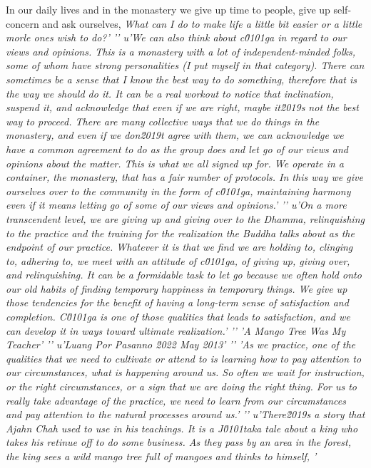 In our daily lives and in the monastery we give up time to people, give 
up self-concern and ask ourselves, \emph{What can I do to make life a 
little bit easier or a little morle ones wish to do?'
'\n'
u'We can also think about c\u0101ga in regard to our views and opinions. This is a monastery with a lot of independent-minded folks, some of whom have strong personalities (I put myself in that category). There can sometimes be a sense that I know the best way to do something, therefore that is the way we should do it. It can be a real workout to notice that inclination, suspend it, and acknowledge that even if we are right, maybe it\u2019s not the best way to proceed. There are many collective ways that we do things in the monastery, and even if we don\u2019t agree with them, we can acknowledge we have a common agreement to do as the group does and let go of our views and opinions about the matter. This is what we all signed up for. We operate in a container, the monastery, that has a fair number of protocols. In this way we give ourselves over to the community in the form of c\u0101ga, maintaining harmony even if it means letting go of some of our views and opinions.'
'\n'
u'On a more transcendent level, we are giving up and giving over to the Dhamma, relinquishing to the practice and the training for the realization the Buddha talks about as the endpoint of our practice. Whatever it is that we find we are holding to, clinging to, adhering to, we meet with an attitude of c\u0101ga, of giving up, giving over, and relinquishing. It can be a formidable task to let go because we often hold onto our old habits of finding temporary happiness in temporary things. We give up those tendencies for the benefit of having a long-term sense of satisfaction and completion. C\u0101ga is one of those qualities that leads to satisfaction, and we can develop it in ways toward ultimate realization.'
'\n'
'A Mango Tree Was My Teacher'
'\n'
u'Luang Por Pasanno \u2022 May 2013'
'\n'
'As we practice, one of the qualities that we need to cultivate or attend to is learning how to pay attention to our circumstances, what is happening around us. So often we wait for instruction, or the right circumstances, or a sign that we are doing the right thing. For us to really take advantage of the practice, we need to learn from our circumstances and pay attention to the natural processes around us.'
'\n'
u'There\u2019s a story that Ajahn Chah used to use in his teachings. It is a J\u0101taka tale about a king who takes his retinue off to do some business. As they pass by an area in the forest, the king sees a wild mango tree full of mangoes and thinks to himself, '
}
